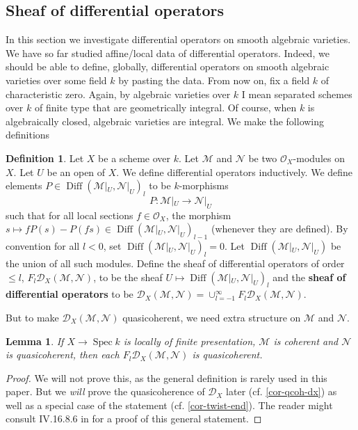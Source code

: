 \documentclass[11pt, a4paper]{article}
\newtheorem{lemma}[theorem]{Lemma}
\theoremstyle{definition}
\newtheorem{definition}[theorem]{Definition}
\newcommand{\Spec}[0]{\operatorname{Spec}}
\newcommand{\Diff}{\operatorname{Diff}}
\begin{document}
    \subsection{Sheaf of differential operators}
    In this section we investigate differential operators on smooth algebraic varieties. We have so far studied affine/local data of differential operators. Indeed, we should be able to define, globally, differential operators on smooth algebraic varieties over some field $k$ by pasting the data. From now on, fix a field $k$ of characteristic zero. Again, by algebraic varieties over $k$ I mean separated schemes over $k$ of finite type that are geometrically integral. Of course, when $k$ is algebraically closed, algebraic varieties are integral. We make the following definitions
    \begin{definition}\label{def-ega-d}
        Let $X$ be a scheme over $k$. Let $\mathcal M$ and $\mathcal N$ be two $\mathcal O_X$-modules on $X$. Let $U$ be an open of $X$. We define differential operators inductively. We define elements $P\in\Diff(\mathcal M|_U, \mathcal N|_U)_l$ to be $k$-morphisms \[P:\mathcal M|_U\to \mathcal N|_U\] 
        such that for all local sections $f\in\mathcal O_X$, the morphism $s\mapsto fP(s)-P(fs)\in\Diff(\mathcal M|_U, \mathcal N|_U)_{l-1}$ (whenever they are defined). By convention for all $l<0$, set $\Diff(\mathcal M|_U, \mathcal N|_U)_l=0$. Let $\Diff(\mathcal M|_U, \mathcal N|_U)$ be the union of all such modules. Define the sheaf of differential operators of order $\leqslant l$, $F_l\mathcal D_X(\mathcal M,\mathcal N)$, to be the sheaf $U\mapsto\Diff(\mathcal M|_U, \mathcal N|_U)_l$ and the \textbf{sheaf of differential operators} to be $\mathcal D_X(\mathcal M,\mathcal N)=\cup_{l=-1}^\infty F_l\mathcal D_X(\mathcal M,\mathcal N)$.
    \end{definition}
    But to make $\mathcal D_X(\mathcal M, \mathcal N)$ quasicoherent, we need extra structure on $\mathcal M$ and $\mathcal N$.
    \begin{lemma}\label{lem-diff-bij}
        If $X\to \Spec k$ is locally of finite presentation, $\mathcal M$ is coherent and $\mathcal N$ is quasicoherent, then each $F_l\mathcal D_X(\mathcal M,\mathcal N)$ is quasicoherent.
    \end{lemma}
    \begin{proof}
        We will not prove this, as the general definition is rarely used in this paper. But we \textit{will} prove the quasicoherence of $\mathcal D_X$ later (cf. \cref{cor-qcoh-dx}) as well as a special case of the statement (cf. \cref{cor-twist-end}). The reader might consult IV.16.8.6 in \cite{ega} for a proof of this general statement.
    \end{proof}
\end{document}
